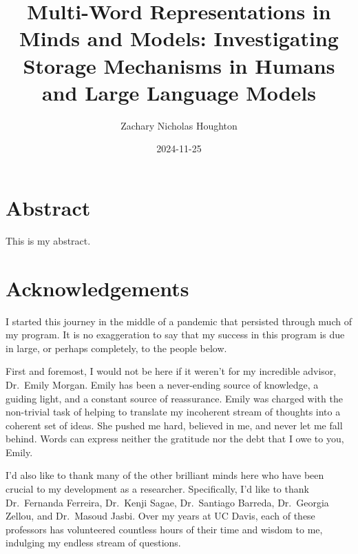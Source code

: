 \documentclass[
  letterpaper,
  DIV=11,
  numbers=noendperiod,
  nottoc,
  oneside]{scrreprt}
\title{Multi-Word Representations in Minds and Models: Investigating
Storage Mechanisms in Humans and Large Language Models}
\author{Zachary Nicholas Houghton}
\date{2024-11-25}
\renewcommand*\contentsname{Table of contents}
\newcommand\contentsname{Table of contents}
\begin{document}
\maketitle


\renewcommand*\contentsname{Table of contents}
{
\setcounter{tocdepth}{2}
\tableofcontents
}
\listoffigures
\listoftables


\chapter*{Abstract}\label{sec-abstract}


This is my abstract.


\chapter*{Acknowledgements}\label{sec-acknowledgements}


I started this journey in the middle of a pandemic that persisted
through much of my program. It is no exaggeration to say that my success
in this program is due in large, or perhaps completely, to the people
below. {}

First and foremost, I would not be here if it weren't for my incredible
advisor, Dr.~Emily Morgan. Emily has been a never-ending source of
knowledge, a guiding light, and a constant source of reassurance. Emily
was charged with the non-trivial task of helping to translate my
incoherent stream of thoughts into a coherent set of ideas. She pushed
me hard, believed in me, and never let me fall behind. Words can express
neither the gratitude nor the debt that I owe to you, Emily.

I'd also like to thank many of the other brilliant minds here who have
been crucial to my development as a researcher. Specifically, I'd like
to thank Dr.~Fernanda Ferreira, Dr.~Kenji Sagae, Dr.~Santiago Barreda,
Dr.~Georgia Zellou, and Dr.~Masoud Jasbi. Over my years at UC Davis,
each of these professors has volunteered countless hours of their time
and wisdom to me, indulging my endless stream of questions.
\end{document}
